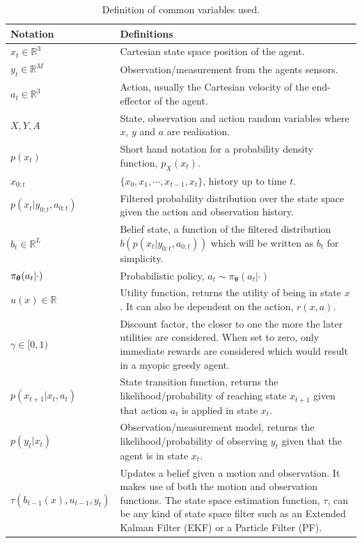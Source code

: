 \begin{table}
\begin{center}
\renewcommand{\arraystretch}{1.5}
\begin{tabular}{|l|p{9cm}|} 
\hline
    \textbf{Notation} 			 	& \textbf{Definitions} \\ \hline\hline
    $x_t \in \mathbb{R}^3$ 		 	& Cartesian state space position of the agent.\\
    $y_t \in \mathbb{R}^{M}$		 	& Observation/measurement from the agents sensors.\\
    $a_t \in \mathbb{R}^3$		 	& Action, usually the Cartesian velocity of the end-effector of the agent.\\
    $X,Y,A$				 	& State, observation and action random variables where $x$, $y$ and $a$ are realisation.\\
    $p(x_t)$ 					& Short hand notation for a probability density function, $p_{X}(x_t)$.\\
    $x_{0:t}$					& $\{x_0,x_1,\cdots,x_{t-1},x_t\}$, history up to time $t$.\\
    $p(x_t|y_{0:t},a_{0:t})$	 		& Filtered probability distribution over the state space given the action and observation history.\\
    $b_t \in \mathbb{R}^{L}$			& Belief state, a function of the filtered distribution 
						 $b(p(x_t|y_{0:t},a_{0:t}))$ which will be written as $b_t$ for simplicity.\\
    $\operatorname{\pi_{\boldsymbol{\theta}}}(a_t|\cdot)$ 			& Probabilistic policy, $a_t \sim \pi_{\boldsymbol{\theta}}(a_t|\cdot)$ \\
    $u(x) \in \mathbb{R}$			& Utility function, returns the utility of being in state $x$. It can also be dependent on the action, $r(x,a)$.\\
    $\gamma \in [0,1)$				& Discount factor, the closer to one the more the later utilities are considered. When set to zero, only immediate rewards are 
						  considered which would result in a myopic greedy agent.\\
    $p(x_{t+1}|x_t,a_t)$			& State transition function, returns the likelihood/probability of reaching state $x_{t+1}$ given that action $a_t$ is applied in state $x_t$.\\	
    $p(y_t|x_t)$				& Observation/measurement model, returns the likelihood/probability of observing $y_t$ given that the agent is in state $x_t$.\\
    $\tau(b_{t-1}(x),u_{t-1},y_t)$		& Updates a belief given a motion and observation. It makes use of both the motion and observation functions. The state space estimation function, $\tau$, can be any kind of state space filter such as an Extended Kalman Filter (EKF) or a Particle Filter (PF).
    \\ \hline
\end{tabular}
\end{center}
\caption{Definition of common variables used.}
\label{tab:notation}
\end{table}


